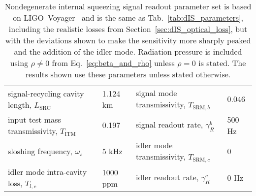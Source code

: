 \begin{table}
\centering
\begin{tabular}{@{}ll|ll@{}}
\toprule
signal-recycling cavity length, $L_\text{SRC}$ & 1.124 km & signal mode transmissivity, $T_{\text{SRM},b}$ & 0.046 \\
input test mass transmissivity, $T_\text{ITM}$ & 0.197 & signal readout rate, $\gamma^b_R$ & 500 Hz \\
sloshing frequency, $\omega_s$ & 5 kHz & idler mode transmissivity, $T_{\text{SRM},c}$ & 0 \\
idler mode intra-cavity loss, $T_{l,c}$ & 1000 ppm & idler readout rate, $\gamma^c_R$ & 0 Hz \\ \bottomrule
\end{tabular}
\caption{Nondegenerate internal squeezing signal readout parameter set is based on LIGO~Voyager~\cite{} and is the same as Tab.~\ref{tab:dIS_parameters}, including the realistic losses from Section~\ref{sec:dIS_optical_loss}, but with the deviations shown to make the sensitivity more sharply peaked and the addition of the idler mode. Radiation pressure is included using $\rho\neq0$ from Eq.~\ref{eq:beta_and_rho} unless $\rho=0$ is stated. The results shown use these parameters unless stated otherwise.}
\label{tab:signal_RO_parameters}
\end{table}

